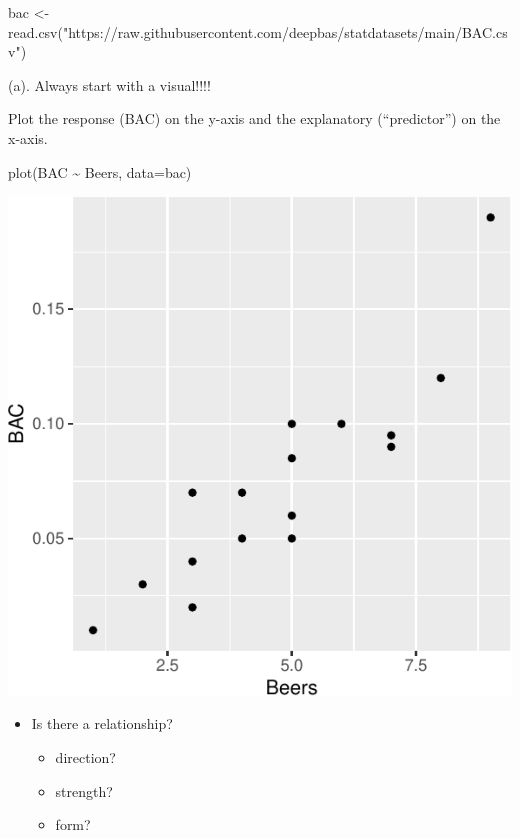 \documentclass[
]{book}
\newenvironment{Shaded}{\begin{snugshade}}{\end{snugshade}}
\newcommand{\AttributeTok}[1]{\textcolor[rgb]{0.77,0.63,0.00}{#1}}
\newcommand{\FunctionTok}[1]{\textcolor[rgb]{0.00,0.00,0.00}{#1}}
\newcommand{\NormalTok}[1]{#1}
\newcommand{\OtherTok}[1]{\textcolor[rgb]{0.56,0.35,0.01}{#1}}
\newcommand{\SpecialCharTok}[1]{\textcolor[rgb]{0.00,0.00,0.00}{#1}}
\newcommand{\StringTok}[1]{\textcolor[rgb]{0.31,0.60,0.02}{#1}}
\providecommand{\tightlist}{%
  \setlength{\itemsep}{0pt}\setlength{\parskip}{0pt}}
\begin{document}
\begin{Shaded}
\begin{Highlighting}[]
\NormalTok{bac }\OtherTok{\textless{}{-}} \FunctionTok{read.csv}\NormalTok{(}\StringTok{"https://raw.githubusercontent.com/deepbas/statdatasets/main/BAC.csv"}\NormalTok{)}
\end{Highlighting}
\end{Shaded}

(a). Always start with a visual!!!!

Plot the response (BAC) on the y-axis and the explanatory (``predictor'') on the x-axis.

\begin{Shaded}
\begin{Highlighting}[]
\FunctionTok{plot}\NormalTok{(BAC }\SpecialCharTok{\textasciitilde{}}\NormalTok{ Beers, }\AttributeTok{data=}\NormalTok{bac)  }
\end{Highlighting}
\end{Shaded}

\includegraphics[width=1\linewidth]{Class_Activity_6_files/figure-latex/unnamed-chunk-2-1}

\begin{itemize}
\tightlist
\item
  Is there a relationship?

  \begin{itemize}
  \tightlist
  \item
    direction?
  \item
    strength?
  \item
    form?
  \end{itemize}
\end{itemize}
\end{document}

